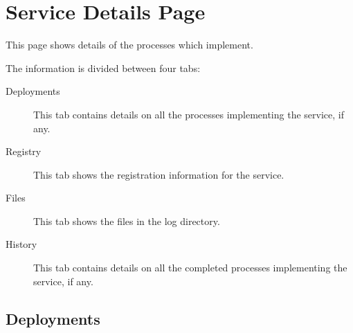 % 
% 
% 
% 
\section{Service Details Page}
\label{sec:ws-service-details}

This page shows details of the processes which implement. 

The information is divided between four tabs:

   \begin{description}
       \item[Deployments] This tab contains details on all the processes implementing
         the service, if any.
       \item[Registry] This tab shows the registration information for the service.
       \item[Files] This tab shows the files in the log directory. 
       \item[History] This tab contains details on all the completed processes implementing the service, if any.  
   \end{description}  

   \subsection{Deployments}
   \label{sec:ws-services-processes}

